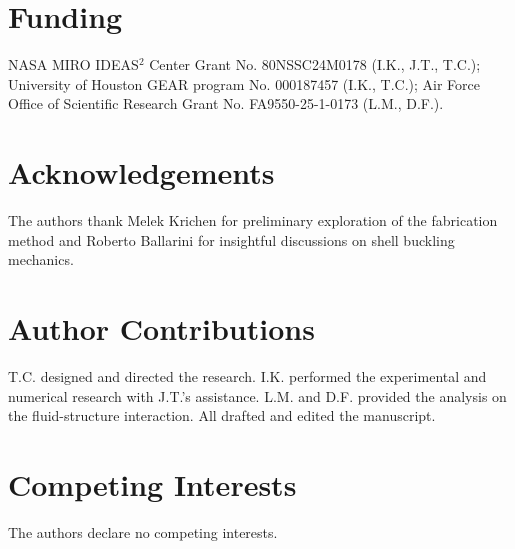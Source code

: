 \documentclass[twocolumn,letter,11pt]{article}
\begin{document}
\section*{Funding}
NASA MIRO IDEAS$^2$ Center Grant No. 80NSSC24M0178 (I.K., J.T., T.C.); University of Houston GEAR program No. 000187457 (I.K., T.C.); Air Force Office of Scientific Research Grant No. FA9550-25-1-0173 (L.M., D.F.).

\section*{Acknowledgements}
The authors thank Melek Krichen for preliminary exploration of the fabrication method and Roberto Ballarini for insightful discussions on shell buckling mechanics. 

\section*{Author Contributions} T.C. designed and directed the research. I.K. performed the experimental and numerical research with J.T.'s assistance. L.M. and D.F. provided the analysis on the fluid-structure interaction. All drafted and edited the manuscript.

\section*{Competing Interests} The authors declare no competing interests.
\end{document}
